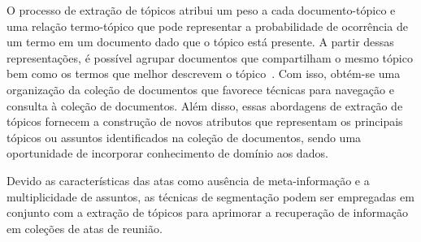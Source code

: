 O processo de extração de tópicos atribui um peso a cada documento-tópico e uma relação termo-tópico que pode representar a probabilidade de ocorrência de um termo em um documento dado que o tópico está presente. A partir dessas representações, é possível agrupar documentos que compartilham o mesmo tópico bem como os termos que melhor descrevem o tópico~\cite{Aggarwal2018}. Com isso, obtém-se uma organização da coleção de documentos que favorece técnicas para navegação e consulta à coleção de documentos\cite{Maracini2010}. 
% 
Além disso, essas abordagens de extração de tópicos fornecem a construção de novos atributos que representam os principais tópicos ou assuntos identificados na coleção de documentos, sendo uma oportunidade de incorporar conhecimento de domínio aos dados. 
















Devido as características das atas como ausência de meta-informação e a multiplicidade de assuntos, as técnicas de segmentação podem ser empregadas em conjunto com a extração de tópicos para aprimorar a recuperação de informação em coleções de atas de reunião. 

